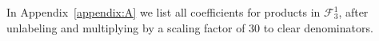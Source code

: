 \documentclass[12pt]{article}
\theoremstyle{definition}
\theoremstyle{remark}
\newcommand{\vc}[1]{\ensuremath{\vcenter{\hbox{#1}}}}
\def\outercycle#1#2{ \draw \foreach \x in {0,1,...,#1}{(270-45+\x*360/#2:0.5) coordinate(x\x)};}
\begin{document}
%
%

In Appendix~\ref{appendix:A} we list all coefficients for products in $\mathcal{F}^1_3$, after unlabeling and multiplying by a scaling factor of 30 to clear denominators. 
%
\end{document}
